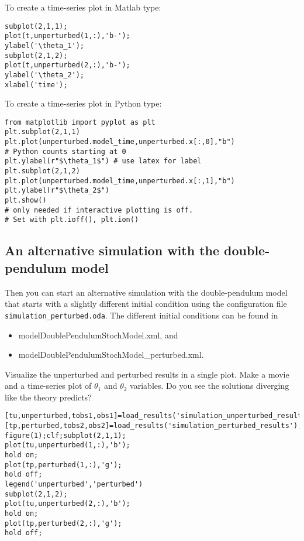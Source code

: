 \ifshowmatlab
To create a time-series plot in Matlab type:
\begin{lstlisting}[style=MatlabStyle,frame=single,caption={Matlab}]
subplot(2,1,1);
plot(t,unperturbed(1,:),'b-');
ylabel('\theta_1');
subplot(2,1,2);
plot(t,unperturbed(2,:),'b-');
ylabel('\theta_2');
xlabel('time');
\end{lstlisting}
\fi
      
To create a time-series plot in Python type:
\begin{lstlisting}[style=PythonStyle,caption={Python}]
from matplotlib import pyplot as plt
plt.subplot(2,1,1)
plt.plot(unperturbed.model_time,unperturbed.x[:,0],"b") 
# Python counts starting at 0
plt.ylabel(r"$\theta_1$") # use latex for label
plt.subplot(2,1,2)
plt.plot(unperturbed.model_time,unperturbed.x[:,1],"b")
plt.ylabel(r"$\theta_2$")
plt.show() 
# only needed if interactive plotting is off. 
# Set with plt.ioff(), plt.ion()
\end{lstlisting}
%
\subsection{An alternative simulation with the double-pendulum model}

Then you can start an alternative simulation with the double-pendulum model that
starts with a slightly different initial condition using the
configuration file \texttt{ simulation\_perturbed.oda}. The different initial conditions
can be found in 
\begin{itemize}
 \item {\ttfamily model\/DoublePendulumStochModel.xml}, and 
 \item {\ttfamily model\/DoublePendulumStochModel\_perturbed.xml}.
\end{itemize}

Visualize the unperturbed and perturbed results in a single plot. Make
       a movie and a time-series plot of $\theta_1$ and $\theta_2$ variables. Do you see
       the solutions diverging like the theory predicts?
       
\ifshowmatlab
\begin{lstlisting}[style=MatlabStyle, caption={Matlab}]
[tu,unperturbed,tobs1,obs1]=load_results('simulation_unperturbed_results');
[tp,perturbed,tobs2,obs2]=load_results('simulation_perturbed_results');
figure(1);clf;subplot(2,1,1);
plot(tu,unperturbed(1,:),'b');
hold on;
plot(tp,perturbed(1,:),'g');
hold off;
legend('unperturbed','perturbed')
subplot(2,1,2);
plot(tu,unperturbed(2,:),'b');
hold on;
plot(tp,perturbed(2,:),'g');
hold off;\end{lstlisting}
\fi
      
